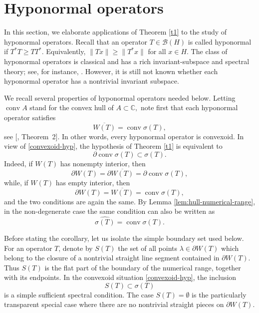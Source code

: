 \documentclass[11pt]{amsart}
\makeatletter
\numberwithin{equation}{section}
\theoremstyle{definition}
\theoremstyle{remark}
\newcommand{\loccite}[2]{[\@ifundefined{b@#2}{\textbf{??}}{\csname b@#2\endcsname}, #1]}
\DeclareMathOperator{\conv}{conv}
\newcommand{\BH}{\mathcal B(H)}
\makeatother
\begin{document}
\section{Hyponormal operators}
In this section, we elaborate applications of Theorem \ref{t1} to the study of hyponormal operators.
Recall that
an operator $T\in\BH$ is called hyponormal if $T^*T\ge TT^*$. Equivalently, $\|Tx\|\ge\|T^*x\|$ for all $x\in H$.
The class of hyponormal operators is classical and has a rich invariant-subspace and spectral theory; see, for instance, \cite[Ch.~IV]{MP}.
However, it is still not known whether each hyponormal operator has a nontrivial invariant subspace.

We recall several properties of hyponormal operators needed below.
Letting $\conv A$ stand for the convex hull of $A \subset \mathbb C,$ note first that each hyponormal operator satisfies
\begin{equation}\label{convexoid-hyp}
\overline{W(T)}=\conv\sigma(T),
\end{equation}
see \loccite{Theorem~2}{S}. In other words, every hyponormal operator is convexoid.
In view of \eqref{convexoid-hyp}, the hypothesis of Theorem \ref{t1}
is equivalent to
\begin{equation}\label{boundary-conv-spectrum}
\partial\conv\sigma(T)\subset\sigma(T).
\end{equation}
Indeed, if $W(T)$ has nonempty interior, then
\[
\partial W(T)=\partial\overline{W(T)}=\partial\conv\sigma(T),
\]
while, if $W(T)$ has empty interior, then
\[
\partial W(T)=\overline{W(T)}=\conv\sigma(T),
\]
and the two conditions are again the same. By Lemma
\ref{lem:hull-numerical-range}, in the non-degenerate case the same condition
can also be written as
\begin{equation}\label{hull-conv-spectrum}
        \widehat{\sigma(T)}=\conv\sigma(T).
\end{equation}


Before stating the corollary, let us isolate the simple boundary set used below. For an operator $T$, denote by $S(T)$ the set of all points $\lambda\in\partial W(T)$ which belong to the closure of a nontrivial straight line segment contained in $\partial W(T)$. Thus $S(T)$ is the flat part of the boundary of the numerical range, together with its endpoints. In the convexoid situation \eqref{convexoid-hyp}, the inclusion
\[
    S(T)\subset\sigma(T)
\]
is a simple sufficient spectral condition. The case $S(T)=\emptyset$ is the particularly transparent special case where there are no nontrivial straight pieces on $\partial W(T)$.
\end{document}
